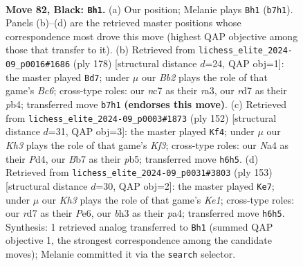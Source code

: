 \documentclass[11pt]{article}
\begin{document}
\clearpage

\begin{figure}[p]\centering
\begin{subfigure}{0.46\textwidth}\centering
\resizebox{\linewidth}{!}{%
\newchessgame
\chessboard[
  setfen={8/PbNR4/7k/5P2/np6/6PB/5K1P/8 b - - 2 82},
  showmover=false,
  pgfstyle=straightmove, color=movearrow, markmove={b7-h1}
]}
\caption{}
\end{subfigure}\hfill
\begin{subfigure}{0.46\textwidth}\centering
\resizebox{\linewidth}{!}{%
\newchessgame
\chessboard[
  setfen={8/7p/2B2k2/2p2b2/1pP2P2/r7/3K4/8 w - - 6 90},
  showmover=false,
  pgfstyle=straightmove, color=movearrow, markmove={c6-d7}
]}
\caption{}
\end{subfigure}
\\[4pt]
\begin{subfigure}{0.46\textwidth}\centering
\resizebox{\linewidth}{!}{%
\newchessgame
\chessboard[
  setfen={8/3bk3/2p3Bp/1p1p4/1P1P3P/5K2/8/8 w - - 12 77},
  showmover=false,
  pgfstyle=straightmove, color=movearrow, markmove={f3-f4}
]}
\caption{}
\end{subfigure}\hfill
\begin{subfigure}{0.46\textwidth}\centering
\resizebox{\linewidth}{!}{%
\newchessgame
\chessboard[
  setfen={4k3/2b5/4p3/p6p/P7/4P3/1N3PK1/8 b - - 6 77},
  showmover=false,
  pgfstyle=straightmove, color=movearrow, markmove={e8-e7}
]}
\caption{}
\end{subfigure}
\caption{\textbf{Move 82, Black: \texttt{Bh1}.} (a) Our position; Melanie plays \texttt{Bh1} (\texttt{b7h1}). Panels (b)--(d) are the retrieved master positions whose correspondence most drove this move (highest QAP objective among those that transfer to it). (b) Retrieved from \texttt{lichess\_elite\_2024-09\_p0016\#1686} (ply 178) [structural distance $d$=24, QAP obj=1]: the master played \texttt{Bd7}; under $\mu$ our \emph{Bb2} plays the role of that game's \emph{Bc6}; cross-type roles: our \emph{n}c7 as their \emph{r}a3, our \emph{r}d7 as their \emph{p}b4; transferred move \texttt{b7h1} \textbf{(endorses this move)}. (c) Retrieved from \texttt{lichess\_elite\_2024-09\_p0003\#1873} (ply 152) [structural distance $d$=31, QAP obj=3]: the master played \texttt{Kf4}; under $\mu$ our \emph{Kh3} plays the role of that game's \emph{Kf3}; cross-type roles: our \emph{N}a4 as their \emph{P}d4, our \emph{B}b7 as their \emph{p}b5; transferred move \texttt{h6h5}. (d) Retrieved from \texttt{lichess\_elite\_2024-09\_p0031\#3803} (ply 153) [structural distance $d$=30, QAP obj=2]: the master played \texttt{Ke7}; under $\mu$ our \emph{Kh3} plays the role of that game's \emph{Ke1}; cross-type roles: our \emph{r}d7 as their \emph{P}e6, our \emph{b}h3 as their \emph{p}a4; transferred move \texttt{h6h5}. Synthesis: 1 retrieved analog transferred to \texttt{Bh1} (summed QAP objective 1, the strongest correspondence among the candidate moves); Melanie committed it via the \texttt{search} selector.}
\label{fig:thought-m163}
\end{figure}
\end{document}
